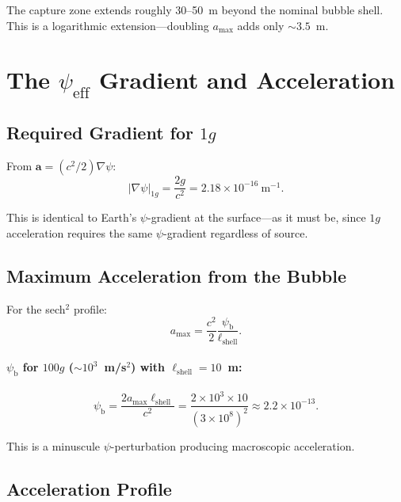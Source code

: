 \documentclass[12pt,aps,prd,superscriptaddress,nofootinbib,longbibliography]{revtex4-2}
\newcommand{\avec}{\mathbf{a}}
\newcommand{\psib}{\psi_{\mathrm{b}}}
\newcommand{\Lshell}{\ell_{\mathrm{shell}}}
\begin{document}
The capture zone extends roughly 30--50~m beyond the nominal bubble
shell.  This is a logarithmic extension---doubling $a_{\mathrm{max}}$
adds only $\sim 3.5$~m.


\section{The $\psi_{\mathrm{eff}}$ Gradient and Acceleration}
\label{sec:gradient}

\subsection{Required Gradient for $1g$}

From $\avec = (c^2/2)\nabla\psi$:
\begin{equation}
|\nabla\psi|_{1g} = \frac{2g}{c^2} = 2.18 \times 10^{-16}~\mathrm{m}^{-1}.
\end{equation}

This is identical to Earth's $\psi$-gradient at the surface---as it must
be, since $1g$ acceleration requires the same $\psi$-gradient regardless
of source.

\subsection{Maximum Acceleration from the Bubble}

For the sech$^2$ profile:
\begin{equation}
a_{\mathrm{max}} = \frac{c^2}{2}\frac{\psib}{\Lshell}.
\end{equation}

\paragraph{$\psib$ for $100g$ ($\sim 10^3$~m/s$^2$) with $\Lshell = 10$~m:}
\begin{equation}
\psib = \frac{2 a_{\mathrm{max}} \Lshell}{c^2}
= \frac{2 \times 10^3 \times 10}{(3 \times 10^8)^2}
\approx 2.2 \times 10^{-13}.
\end{equation}

This is a minuscule $\psi$-perturbation producing macroscopic acceleration.

\subsection{Acceleration Profile}
\end{document}
